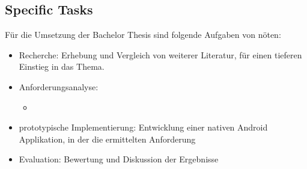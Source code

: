 \subsection{Specific Tasks}
\label{subsec:specific-tasks}

Für die Umsetzung der Bachelor Thesis sind folgende Aufgaben von nöten:
%
\begin{itemize}
    \item Recherche: Erhebung und Vergleich von weiterer Literatur, für einen tieferen Einstieg in das Thema.
    \item Anforderungsanalyse: 
        \begin{itemize}
            \item 
        \end{itemize}
    \item prototypische Implementierung: Entwicklung einer nativen Android Applikation, in der 
    die ermittelten Anforderung 
    \item Evaluation: Bewertung und Diskussion der Ergebnisse
\end{itemize}